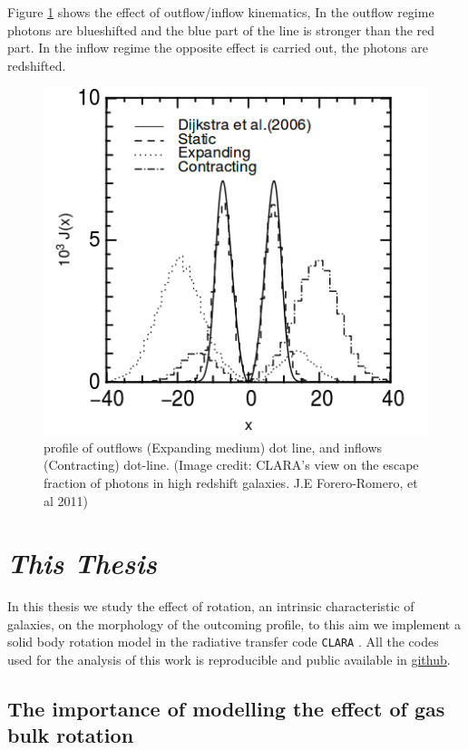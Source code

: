Figure \ref{fig:out} shows the effect of outflow/inflow kinematics, 
In the outflow regime photons are blueshifted and the blue part of the line
is stronger than the red part. In the inflow regime the opposite effect
is carried out, the \ly photons are redshifted. 

\begin{figure}[H]%
\begin{center}
\includegraphics[scale=0.4]{../Figures/out.png}
\end{center}\caption{\ly profile of outflows (Expanding medium) dot line, 
and inflows (Contracting) dot-line. (Image credit: CLARA's view on the escape fraction of \ly photons in high redshift galaxies. J.E Forero-Romero, et al 2011)\label{fig:out}
 }
\end{figure}

\section{\emph{This Thesis}}

In this thesis we study the effect of rotation, an intrinsic
 characteristic of galaxies, on the morphology
of the \lya outcoming profile, to this aim we implement a solid body
rotation model in the radiative transfer code \verb+CLARA+ \citep{CLARA}.
All the codes used for the analysis of this work is reproducible
and public available in \href{https://github.com/jngaravitoc/RotationLyAlpha}{github}.

\subsection{The importance of modelling the effect of gas bulk rotation}

